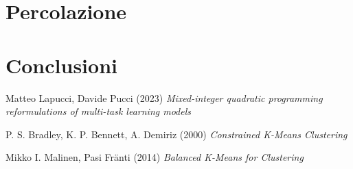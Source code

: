 \documentclass{article}
\begin{document}
    \section{Percolazione}


    \section{Conclusioni}

    \begin{thebibliography}{9}
Matteo Lapucci, Davide Pucci (2023) \emph{Mixed-integer quadratic programming reformulations of multi-task learning models}

P. S. Bradley, K. P. Bennett, A. Demiriz (2000) \emph{Constrained K-Means Clustering}

Mikko I. Malinen, Pasi Fränti (2014) \emph{Balanced K-Means for Clustering}

\end{thebibliography}
\end{document}
